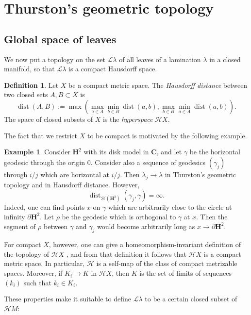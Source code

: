 \documentclass[reqno,10pt]{amsart}
\newcommand{\CC}{\mathbf{C}}
\newcommand{\Hyp}{\mathbf H}
\DeclareMathOperator{\dist}{dist}
\newcommand{\Leaves}{\mathscr L}
\newcommand{\Hypspace}{\mathscr H}
\newcommand{\dfn}[1]{\emph{#1}\index{#1}}
\theoremstyle{definition}
\newtheorem{definition}[theorem]{Definition}
\newtheorem{example}[theorem]{Example}
\numberwithin{equation}{section}
\begin{document}
\section{Thurston's geometric topology}
\subsection{Global space of leaves}
We now put a topology on the set $\Leaves \lambda$ of all leaves of a lamination $\lambda$ in a closed manifold, so that $\Leaves \lambda$ is a compact Hausdorff space.

\begin{definition}
Let $X$ be a compact metric space. The \dfn{Hausdorff distance} between two closed sets $A, B \subset X$ is
$$\dist(A, B) := \max\left(\max_{a \in A} \min_{b \in B} \dist(a, b), \max_{b \in B} \min_{a \in A} \dist(a, b)\right).$$
The space of closed subsets of $X$ is the \dfn{hyperspace} $\Hypspace X$.
\end{definition}

The fact that we restrict $X$ to be compact is motivated by the following example.

\begin{example}
Consider $\Hyp^2$ with its disk model in $\CC$, and let $\gamma$ be the horizontal geodesic through the origin $0$.
Consider also a sequence of geodesics $(\gamma_j)$ through $i/j$ which are horizontal at $i/j$.
Then $\lambda_j \to \lambda$ in Thurston's geometric topology and in Hausdorff distance.
However,
$$\dist_{\mathscr H(\Hyp^2)}(\gamma_j, \gamma) = \infty.$$
Indeed, one can find points $x$ on $\gamma$ which are arbitrarily close to the circle at infinity $\partial \Hyp^2$.
Let $\rho$ be the geodesic which is orthogonal to $\gamma$ at $x$.
Then the segment of $\rho$ between $\gamma$ and $\gamma_j$ would become arbitrarily long as $x \to \partial \Hyp^2$.
\end{example}

For compact $X$, however, one can give a homeomorphism-invariant definition of the topology of $\Hypspace X$ \cite[Chapter 4]{nadler2017continuum}, and from that definition it follows that $\Hypspace X$ is a compact metric space.
In particular, $\Hypspace$ is a self-map of the class of compact metrizable spaces.
Moreover, if $K_i \to K$ in $\Hypspace X$, then $K$ is the set of limits of sequences $(k_i)$ such that $k_i \in K_i$.

These properties make it suitable to define $\Leaves \lambda$ to be a certain closed subset of $\Hypspace M$:
\end{document}

